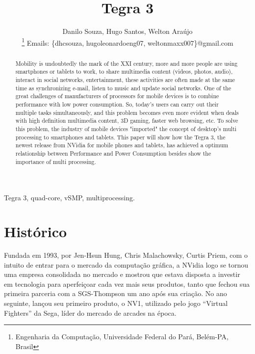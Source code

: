\documentclass[article]{IEEEtran}
\begin{document}
%

\title{Tegra 3}

\author{Danilo Souza, Hugo Santos, Welton Ara\'ujo

\thanks{Engenharia da Computa\c{c}\~ao, Universidade Federal do Par\'a, Bel\'em-PA, Brasil}
Emails: \{dhcsouza, hugoleonardoeng07, weltonmaxx007\}@gmail.com}

\maketitle

\begin{abstract}

Mobility is undoubtedly the mark of the XXI century, more and more people are using smartphones or tablets to work, to share multimedia content (videos, photos, audio), interact in social networks, entertainment, these activities are often made at the same time as synchronizing e-mail, listen to music and update social networks. One of the great challenges of manufacturers of processors for mobile devices is to combine performance with low power consumption. So, today's users can carry out their multiple tasks simultaneously, and this problem becomes even more evident when deals with high definition multimedia content, 3D gaming, faster web browsing, etc. To solve this problem, the industry of mobile devices "imported" the concept of desktop's multi processing to smartphones and tablets. This paper will show how the Tegra 3, the newest release from NVidia for mobile phones and tablets, has achieved a optimum relationship between Performance and Power Consumption besides show the importance of multi processing.

\end{abstract}

\begin{IEEEkeywords}
Tegra 3, quad-core, vSMP, multiprocessing.
\end{IEEEkeywords}

\IEEEpeerreviewmaketitle

\section{Hist\'orico}

Fundada em 1993, por Jen-Hsun Hung, Chris Malachowsky, Curtis Priem,  com o intuito de entrar para o mercado da computa\c{c}\~ao gr\'afica, a NVidia logo se tornou uma empresa consolidada no mercado e mostrou que estava disposta a investir em tecnologia para aperfei\c{c}oar cada vez mais seus produtos, tanto que fechou sua primeira parceria com a SGS-Thompson um ano ap\'os sua cria\c{c}\~ao. No ano seguinte, lan\c{c}ou seu primeiro produto, o NV1, utilizado pelo jogo “Virtual Fighters” da Sega, l\'ider do mercado de arcades na \'epoca.
\end{document}
